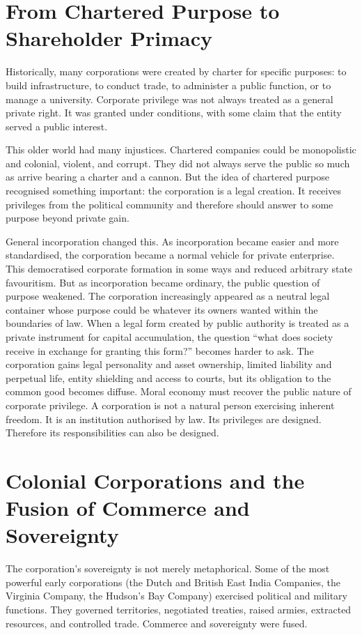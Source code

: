 \documentclass[11pt,a4paper,oneside]{book}
\begin{document}
\section*{From Chartered Purpose to Shareholder Primacy}

Historically, many corporations were created by charter for specific purposes: to build infrastructure, to conduct trade, to administer a public function, or to manage a university. Corporate privilege was not always treated as a general private right. It was granted under conditions, with some claim that the entity served a public interest.

This older world had many injustices. Chartered companies could be monopolistic and colonial, violent, and corrupt. They did not always serve the public so much as arrive bearing a charter and a cannon. But the idea of chartered purpose recognised something important: the corporation is a legal creation. It receives privileges from the political community and therefore should answer to some purpose beyond private gain.

General incorporation changed this. As incorporation became easier and more standardised, the corporation became a normal vehicle for private enterprise. This democratised corporate formation in some ways and reduced arbitrary state favouritism. But as incorporation became ordinary, the public question of purpose weakened. The corporation increasingly appeared as a neutral legal container whose purpose could be whatever its owners wanted within the boundaries of law. When a legal form created by public authority is treated as a private instrument for capital accumulation, the question ``what does society receive in exchange for granting this form?'' becomes harder to ask. The corporation gains legal personality and asset ownership, limited liability and perpetual life, entity shielding and access to courts, but its obligation to the common good becomes diffuse. Moral economy must recover the public nature of corporate privilege. A corporation is not a natural person exercising inherent freedom. It is an institution authorised by law. Its privileges are designed. Therefore its responsibilities can also be designed.

\section*{Colonial Corporations and the Fusion of Commerce and Sovereignty}

The corporation's sovereignty is not merely metaphorical. Some of the most powerful early corporations (the Dutch and British East India Companies, the Virginia Company, the Hudson's Bay Company) exercised political and military functions. They governed territories, negotiated treaties, raised armies, extracted resources, and controlled trade. Commerce and sovereignty were fused.
\end{document}

